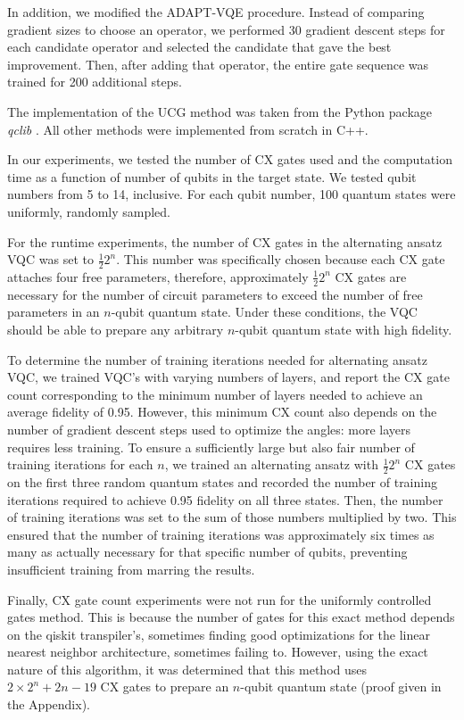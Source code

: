 \documentclass{article}
\begin{document}
In addition, we modified the ADAPT-VQE procedure. Instead of comparing gradient
sizes to choose an operator, we performed 30 gradient descent steps for each
candidate operator and selected the candidate that gave the best
improvement. Then, after adding that operator, the entire gate sequence was
trained for 200 additional steps. 

The implementation of the UCG method
was taken from the Python package \textit{qclib} \cite{Araujo_Quantum_computing_library_2023}. All other methods were 
implemented from scratch in C++. 

In our experiments, we tested the number of CX gates used and the computation
time as a function of number of qubits in the target state. We tested qubit
numbers from 5 to 14, inclusive. For each qubit number, 100 quantum states were
uniformly, randomly sampled.

For the runtime experiments, the number of CX gates in the alternating
ansatz VQC was set to $\frac{1}{2}2^n$. This number was specifically chosen
because each CX gate attaches four free parameters, therefore, approximately
$\frac{1}{2}2^n$ CX gates are necessary for the number of circuit parameters to
exceed the number of free parameters in an $n$-qubit quantum state. Under these
conditions, the VQC should be able to prepare any arbitrary $n$-qubit quantum 
state with high fidelity.

To determine the number of training iterations needed for alternating ansatz 
VQC, we trained VQC's with varying numbers of layers, and report the CX gate 
count corresponding to the minimum number of layers needed to achieve an average
fidelity of 0.95. However, this minimum CX count also depends on the number of 
gradient descent steps used to optimize the angles: more layers requires less
training. To ensure a sufficiently large but also fair number of training 
iterations for each $n$, we trained an
alternating ansatz with $\frac{1}{2}2^n$ CX gates on the first three random
quantum states and recorded the number of training iterations required to
achieve 0.95 fidelity on all three states. Then, the number of training
iterations was set to the sum of those numbers multiplied by two. This ensured
that the number of training iterations was approximately six times as many as
actually necessary for that specific number of qubits, preventing insufficient
training from marring the results.

Finally, CX gate count experiments were not run for the uniformly controlled 
gates method. This is because the number of gates for this exact method depends
on the qiskit transpiler's, sometimes finding good optimizations for the
linear nearest neighbor architecture, sometimes failing to. However, using the
exact nature of this algorithm, it was determined that this method uses
$2\times 2^n + 2n - 19$ CX gates to prepare an $n$-qubit quantum state (proof given in the Appendix). 
\end{document}
